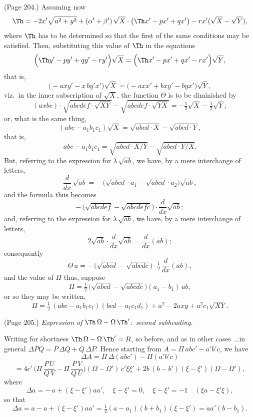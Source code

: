 \documentclass[11pt,a4paper]{book}
\begin{document}
\noindent (Page 204.) Assuming now
\[
\Th = -2x'\sqrt{a^2 + y^2} + (\alpha' + \beta')\,\sqrt{X} \cdot \big(\Th x' - p x' + q x'\big) - r x' (\sqrt{X} - \sqrt{Y}),
\]
where $\Th$ has to be determined so that the first of the same conditions may be satisfied. Then, substituting this value of $\Th$ in the equations
\[
\Big(\Th y' - p y' + q y' - r y'\Big) \sqrt{X} = \Big(\Th x' - p x' + q x' - r x'\Big) \sqrt{Y},
\]
that is,
\[
\Big( - a x y' - x\,b y' x'\Big) \sqrt{X} = \Big( - a x x' + b x y' - b y x'\Big) \sqrt{Y},
\]
viz.\ in the inner subscription of $\sqrt{X}$, the function $\Theta$ is to be diminished by
\[
(a x b c) \cdot \sqrt{a b c d e f \cdot \sqrt{X Y}} - \sqrt{a b c d e f \cdot \sqrt{Y X}} = - \tfrac{1}{2}\sqrt{X} - \tfrac{1}{2}\sqrt{Y};
\]
or, what is the same thing,
\[
(a b c - a_1 b_1 c_1) \sqrt{X} = \sqrt{a b c d \cdot X} - \sqrt{a b c d \cdot Y},
\]
that is,
\[
a b c - a_1 b_1 c_1 = \sqrt{a b c d \cdot X / Y} - \sqrt{a b c d \cdot Y / X}.
\]
But, referring to the expression for $\lambda\,\sqrt{a b}$, we have, by a mere interchange of letters,
\[
\frac{d}{dx}\,\sqrt{a b} = -\,\big(\sqrt{a b c d} \cdot a_1 - \sqrt{a b c d} \cdot a_2\big) \sqrt{a b},
\]
and the formula thus becomes
\[
-\,\big(\sqrt{a b c d e f} - \sqrt{a b c d e f c}\big) \cdot \frac{d}{dx} \sqrt{a b};
\]
and, referring to the expression for $\lambda\,\sqrt{a b}$, we have, by a mere interchange of letters,
\[
2 \sqrt{a b} \cdot \frac{d}{dx} \sqrt{a b} = \frac{d}{dx} (a b);
\]
consequently
\[
\Theta\,a = -\,\big(\sqrt{a b c d} - \sqrt{a b c d c}\big) \cdot \tfrac{1}{2} \, \frac{d}{dx}(a b),
\]
and the value of $\Pi$ thus, suppose
\[
\Pi = \tfrac{1}{2}\,\big(\sqrt{a b c d} - \sqrt{a b c d c}\big) (a_1 - b_1)\, a b,
\]
or so they may be written,
\[
\Pi = \tfrac{1}{2}\,(a b c - a_1 b_1 c_1)(b c d - a_1 c_1 d_1) + a^2 - 2 a x y + a^2 c_1 \sqrt{X Y}.
\]

\medskip

\noindent (Page 205.) \emph{Expression of} $\Th\,\Omega - \Omega\,\Th'$:\ \emph{second subheading.}

Writing for shortness $\Th\,\Omega - \Omega\,\Th' = R$, so before, and as in other cases\ \ldots in general $\Delta P Q = P\,\Delta Q + Q\,\Delta P$. Hence starting from $A = \Pi\,abc' - a'b'c$, we have
\[
\Delta A = \Pi\,\Delta(abc') - \Pi(a'b'c)
\]
\[
= 4 c'\,\Big(\Pi\,\frac{P\,U}{Q\,V} - \Pi\,\frac{P\,V}{Q\,U}\Big)(\Omega - \Omega')\,c' \xi \xi' + 2 b\,(b - b') (\xi - \xi') (\Omega - \Omega'),
\]
where
\[
\Delta a = -\,a + (\xi - \xi') a a', \quad \xi - \xi' = 0, \quad \xi - \xi' = -1 \quad (\xi a - \xi' \xi),
\]
so that
\[
\Delta a = a - a + (\xi - \xi') a a' = \tfrac{1}{2}(a - a_1) (b + b_1) (\xi - \xi') = aa' (b - b_1).
\]
\end{document}
